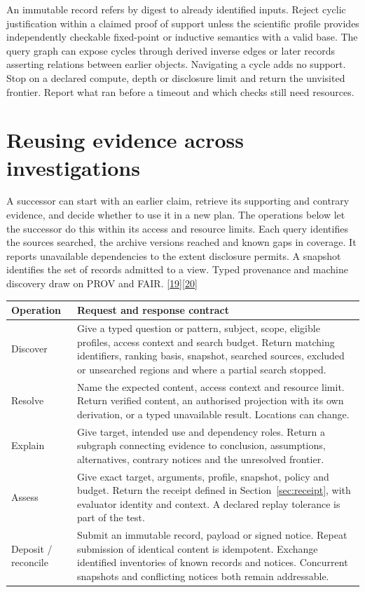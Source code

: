 \documentclass[11pt,a4paper]{article}
\newcommand{\partpage}[1]{\clearpage\section{#1}}
\newcommand{\topic}[1]{\par\smallskip{\sffamily\bfseries\color{ink}#1\par}\nobreak}
\newcommand{\src}[1]{\hyperlink{ref#1}{[#1]}}
\begin{document}
\topic{Cycles and termination}
An immutable record refers by digest to already identified inputs. Reject cyclic justification within a claimed proof of support unless the scientific profile provides independently checkable fixed-point or inductive semantics with a valid base. The query graph can expose cycles through derived inverse edges or later records asserting relations between earlier objects. Navigating a cycle adds no support. Stop on a declared compute, depth or disclosure limit and return the unvisited frontier. Report what ran before a timeout and which checks still need resources.

\partpage{Reusing evidence across investigations}\label{sec:archive}
A successor can start with an earlier claim, retrieve its supporting and contrary evidence, and decide whether to use it in a new plan. The operations below let the successor do this within its access and resource limits. Each query identifies the sources searched, the archive versions reached and known gaps in coverage. It reports unavailable dependencies to the extent disclosure permits. A snapshot identifies the set of records admitted to a view. Typed provenance and machine discovery draw on PROV and FAIR. \src{19}\src{20}

\small
\begin{tabularx}{\linewidth}{@{}L{.19\linewidth}Y@{}}
\toprule
\textbf{Operation} & \textbf{Request and response contract} \\ \midrule
Discover & Give a typed question or pattern, subject, scope, eligible profiles, access context and search budget. Return matching identifiers, ranking basis, snapshot, searched sources, excluded or unsearched regions and where a partial search stopped. \\
Resolve & Name the expected content, access context and resource limit. Return verified content, an authorised projection with its own derivation, or a typed unavailable result. Locations can change. \\
Explain & Give target, intended use and dependency roles. Return a subgraph connecting evidence to conclusion, assumptions, alternatives, contrary notices and the unresolved frontier. \\
Assess & Give exact target, arguments, profile, snapshot, policy and budget. Return the receipt defined in Section~\ref{sec:receipt}, with evaluator identity and context. A declared replay tolerance is part of the test. \\
Deposit / reconcile & Submit an immutable record, payload or signed notice. Repeat submission of identical content is idempotent. Exchange identified inventories of known records and notices. Concurrent snapshots and conflicting notices both remain addressable. \\
\bottomrule
\end{tabularx}
\normalsize
\end{document}
